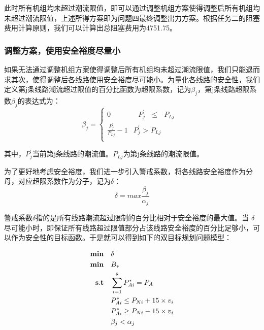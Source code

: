 \documentclass[12pt,a4paper]{ctexart}
\begin{document}
\vspace{1em}


	此时所有机组均未超过潮流限值，即可以通过调整机组方案使得调整后所有机组均未超过潮流限值，上述所得方案即为问题四最终调整出力方案。根据任务二的阻塞费用计算原则，我们可以计算出总阻塞费用为4751.75。

	\subsubsection*{调整方案，使用安全裕度尽量小}
	如果无法通过调整机组方案使得调整后所有机组均未超过潮流限值，我们只能退而求其次，使得调整后各线路使用安全裕度尽可能小。为量化各线路的安全性，我们定义第j条线路潮流超过限值的百分比函数为超限系数，记为$\beta_{j}$，第j条线路超限系数$\beta_{j}$的表达式为：
	\[ \beta_{j}=
	\begin{cases}
		0       &      \text { $P_{j}^{'}$  $\le$ 	$P_{Lj}$ } \\
		\frac{P_{j}^{'}}{ P_{Lj}}  -1     &      \text {$P_{j}^{'}$ > $P_{Lj}$} \\
	\end{cases} \] 

	其中，$P_{j}^{'}$当前第j条线路的潮流值。$P_{Lj}$为第j条线路的潮流限值。

	为了更好地考虑安全裕度，我们进一步引入警戒系数，将各线路安全裕度作为分母，对应超限系数作为分子，记为$\delta$：
	\begin{equation}
		\delta = max{\frac{\beta_{j}}{\alpha_{j}}}
	\end{equation}
	
	警戒系数$\delta$指的是所有线路潮流超过限制的百分比相对于安全裕度的最大值。当 $\delta$ 尽可能小时，即保证所有线路超过限值部分占该线路安全裕度的百分比足够小，可以作为安全性的目标函数。于是就可以得到如下的双目标规划问题模型：
	
	\begin{equation*}
		\begin{split}
			{\bf min}\quad &\delta \\
			{\bf min}\quad &B_{*}\\
			{\bf s.t}\quad &\sum_{i=1}^{8}P_{Ai}^{*} = P_{A}\\
			&P_{Ai}^{*} \le P_{Ni} + 15\times v_{i} \\
			&P_{Ai}^{*} \ge P_{Ni} - 15\times v_{i} \\
			&\beta_{j} <	\alpha_{j}\\
		\end{split}
	\end{equation*}
	
\end{document}
